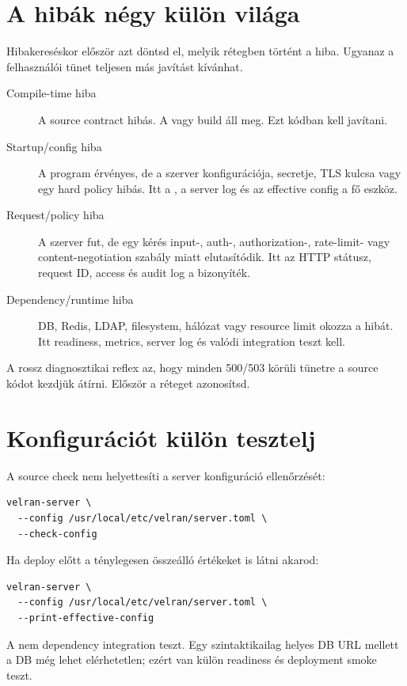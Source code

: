 \section{A hibák négy külön világa}

Hibakereséskor először azt döntsd el, melyik rétegben történt a hiba. Ugyanaz a felhasználói tünet teljesen más javítást kívánhat.

\begin{description}
  \item[Compile-time hiba] A source contract hibás. A  vagy build áll meg. Ezt kódban kell javítani.
  \item[Startup/config hiba] A program érvényes, de a szerver konfigurációja, secretje, TLS kulcsa vagy egy hard policy hibás. Itt a , a server log és az effective config a fő eszköz.
  \item[Request/policy hiba] A szerver fut, de egy kérés input-, auth-, authorization-, rate-limit- vagy content-negotiation szabály miatt elutasítódik. Itt az HTTP státusz, request ID, access és audit log a bizonyíték.
  \item[Dependency/runtime hiba] DB, Redis, LDAP, filesystem, hálózat vagy resource limit okozza a hibát. Itt readiness, metrics, server log és valódi integration teszt kell.
\end{description}

A rossz diagnosztikai reflex az, hogy minden 500/503 körüli tünetre a source kódot kezdjük átírni. Először a réteget azonosítsd.

\section{Konfigurációt külön tesztelj}

A source check nem helyettesíti a server konfiguráció ellenőrzését:

\begin{lstlisting}
velran-server \
  --config /usr/local/etc/velran/server.toml \
  --check-config
\end{lstlisting}

Ha deploy előtt a ténylegesen összeálló értékeket is látni akarod:

\begin{lstlisting}
velran-server \
  --config /usr/local/etc/velran/server.toml \
  --print-effective-config
\end{lstlisting}

A \code{--check-config} nem dependency integration teszt. Egy szintaktikailag helyes DB URL mellett a DB még lehet elérhetetlen; ezért van külön readiness és deployment smoke teszt.


